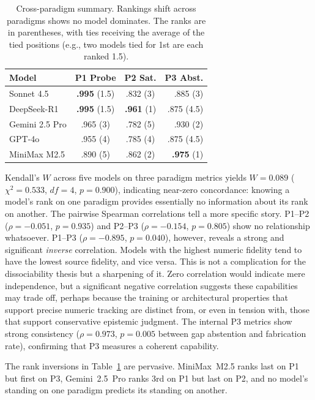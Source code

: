 \documentclass[11pt,a4paper]{article}
\begin{document}
\begin{table}[tbp]
\centering
\caption{Cross-paradigm summary. Rankings shift across paradigms shows no model dominates. The ranks are in parentheses, with ties receiving the average of the tied positions (e.g., two models tied for 1st are each ranked 1.5).}
\label{tab:cross}
\scriptsize
\begin{tabular}{lccr}
\toprule
\textbf{Model} & \textbf{P1 Probe} & \textbf{P2 Sat.} & \textbf{P3 Abst.} \\
\midrule
Sonnet 4.5      & \textbf{.995} (1.5) & .832 (3) & .885 (3) \\
DeepSeek-R1     & \textbf{.995} (1.5) & \textbf{.961} (1) & .875 (4.5) \\
Gemini 2.5 Pro  & .965 (3)   & .782 (5) & .930 (2) \\
GPT-4o          & .955 (4)   & .785 (4) & .875 (4.5) \\
MiniMax M2.5    & .890 (5)   & .862 (2) & \textbf{.975} (1) \\
\bottomrule
\end{tabular}
\end{table}

Kendall's $W$ across five models on three paradigm metrics yields $W = 0.089$ ($\chi^2 = 0.533$, $df = 4$, $p = 0.900$), indicating near-zero concordance: knowing a model's rank on one paradigm provides essentially no information about its rank on another. The pairwise Spearman correlations tell a more specific story. P1--P2 ($\rho = -0.051$, $p = 0.935$) and P2--P3 ($\rho = -0.154$, $p = 0.805$) show no relationship whatsoever. P1--P3 ($\rho = -0.895$, $p = 0.040$), however, reveals a strong and significant \emph{inverse} correlation. Models with the highest numeric fidelity tend to have the lowest source fidelity, and vice versa. This is not a complication for the dissociability thesis but a sharpening of it. Zero correlation would indicate mere independence, but a significant negative correlation suggests these capabilities may trade off, perhaps because the training or architectural properties that support precise numeric tracking are distinct from, or even in tension with, those that support conservative epistemic judgment. The internal P3 metrics show strong consistency ($\rho = 0.973$, $p = 0.005$ between gap abstention and fabrication rate), confirming that P3 measures a coherent capability.

The rank inversions in Table~\ref{tab:cross} are pervasive. MiniMax~M2.5 ranks last on P1 but first on P3, Gemini~2.5~Pro ranks 3rd on P1 but last on P2, and no model's standing on one paradigm predicts its standing on another.
\end{document}
